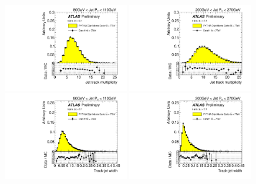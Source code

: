 
\begin{figure}[tp]
\centering
\includegraphics[width=0.49\textwidth]{FIGS/dataMC/FullDataVarNtrkPT080.pdf}
\includegraphics[width=0.49\textwidth]{FIGS/dataMC/FullDataVarNtrkPT200.pdf}
\includegraphics[width=0.49\textwidth]{FIGS/dataMC/FullDataVarTrkWidthPT080.pdf}
\includegraphics[width=0.49\textwidth]{FIGS/dataMC/FullDataVarTrkWidthPT200.pdf}  

\end{figure}
